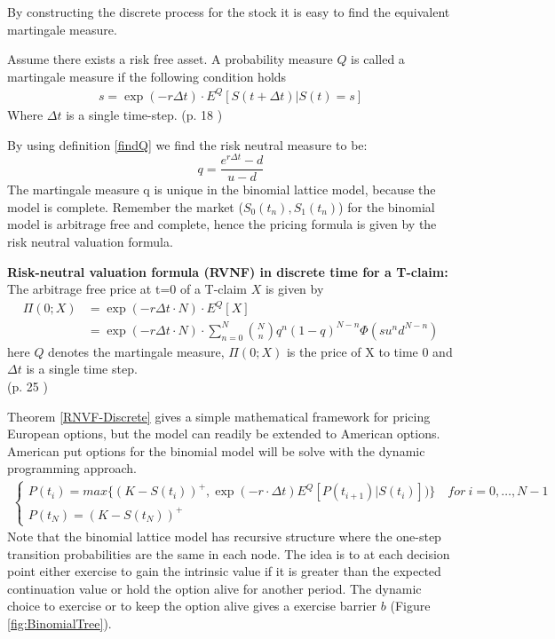 By constructing the discrete process for the stock it is easy to find the equivalent martingale measure. 
\begin{definition}\label{findQ}
Assume there exists a risk free asset. A probability measure $Q$ is called a martingale measure if the following condition holds 
\begin{align}
s= \exp(- r \Delta t) \cdot E^Q[S(t+\Delta t)|S(t)=s] 
\end{align}
Where $\Delta t$ is a single time-step. \hfill (p. 18 \parencite{Bjork19})
\end{definition}
By using definition \ref{findQ} we find the risk neutral measure to be:
$$q=\frac{e^{r \Delta t}-d}{u-d}$$
The martingale measure q is unique in the binomial lattice model, because the model is complete. Remember the market ($S_0(t_n), S_1(t_n)$) for the binomial model is arbitrage free and complete, hence the pricing formula is given by the risk neutral valuation formula.
\begin{theorem}{\textbf{Risk-neutral valuation formula (RVNF) in discrete time for a T-claim: }}\label{RNVF-Discrete}
The arbitrage free price at t=0 of a T-claim $X$ is given by
\begin{align}
\Pi(0;X)&= \exp(- r \Delta t \cdot N) \cdot E^Q[X]\\
&=\exp(- r \Delta t \cdot N) \cdot \sum_{n=0}^{N} \binom{N}{n} q^n (1-q)^{N-n} \Phi(su^n d^{N-n})
\end{align}
here $Q$ denotes the martingale measure, $\Pi(0;X)$ is the price of X to time 0 and $\Delta t$ is a single time step. \\
\null \hfill (p. 25 \parencite{Bjork19})
\end{theorem}

Theorem \ref{RNVF-Discrete} gives a simple mathematical framework for pricing European options, but the model can readily be extended to American options. American put options for the binomial model will be solve with the dynamic programming approach. 
\begin{equation*}\label{BellmanEq2}
\begin{split}
\begin{cases}
          P(t_i) = max\{ (K-S(t_i))^+, \exp(-r\cdot \Delta t) E^Q[P(t_{i+1})|S(t_i)])\} \quad for \ i={0,\ldots,N-1} \\
          P(t_N) = (K-S(t_N))^+ 
\end{cases}
\end{split}
\end{equation*}
Note that the binomial lattice model has recursive structure where the one-step transition probabilities are the same in each node. The idea is to at each decision point either exercise to gain the intrinsic value if it is greater than the expected continuation value or hold the option alive for another period. The dynamic choice to exercise or to keep the option alive gives a exercise barrier $b$ (Figure \ref{fig:BinomialTree}).\\

